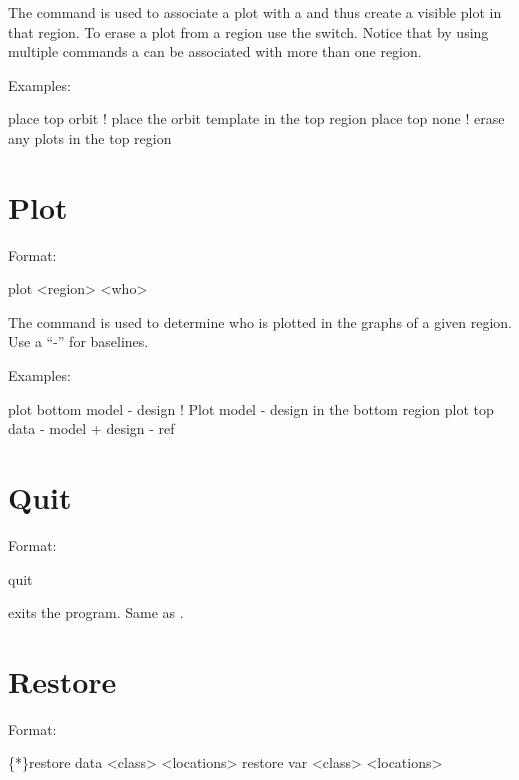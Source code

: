 \vskip 0.2in The  command is used to associate a
 plot with a  and thus create a visible
plot in that region. To erase a plot from a region use the 
switch. Notice that by using multiple  commands a
 can be associated with more than one region. 

Examples:
\begin{example}
  place top orbit  ! place the orbit template in the top region
  place top none   ! erase any plots in the top region
\end{example}

\section{Plot}
\label{s:plot}

Format:
\begin{example}
  plot <region> <who>
\end{example}

\vskip 0.2in The  command is used to determine who is plotted
in the graphs of a given region. Use a ``-'' for baselines. 

Examples:
\begin{example}
  plot bottom model - design       ! Plot model - design in the bottom region
  plot top data - model + design - ref 
\end{example}

\section{Quit}
\label{s:quit}

Format:
\begin{example}
  quit
\end{example}

\vskip 0.2in
 exits the program. Same as .

\section{Restore}
\label{s:restore}

Format:
\begin{example}
  \{*\}restore data  <class> <locations>
  restore var <class> <locations>
\end{example}

